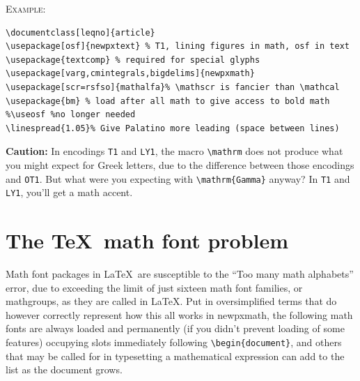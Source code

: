 \documentclass[11pt]{article}
\begin{document}
\textsc{Example:}
\begin{verbatim}
\documentclass[leqno]{article}
\usepackage[osf]{newpxtext} % T1, lining figures in math, osf in text
\usepackage{textcomp} % required for special glyphs
\usepackage[varg,cmintegrals,bigdelims]{newpxmath}
\usepackage[scr=rsfso]{mathalfa}% \mathscr is fancier than \mathcal
\usepackage{bm} % load after all math to give access to bold math
%\useosf %no longer needed
\linespread{1.05}% Give Palatino more leading (space between lines)
\end{verbatim}

\textbf{Caution:} In encodings {\tt T1} and {\tt LY1}, the macro \verb|\mathrm| does not produce what you might expect for Greek letters, due to the difference between those encodings and {\tt OT1}. But what were you expecting with \verb|\mathrm{Gamma}| anyway? In {\tt T1} and {\tt LY1}, you'll get a math accent.

\section{The \TeX\ math font problem}
Math font packages in \LaTeX\ are susceptible to the ``Too many math alphabets'' error, due to exceeding the limit of just sixteen math font families, or mathgroups, as they are called in \LaTeX. Put in oversimplified terms that do however correctly represent how this all works in \textsf{newpxmath}, the following math fonts are always loaded and permanently (if you didn't prevent loading of some features) occupying slots immediately following \verb|\begin{document}|, and others that may be called for in typesetting a mathematical expression can add to the list as the document grows.
\end{document}
